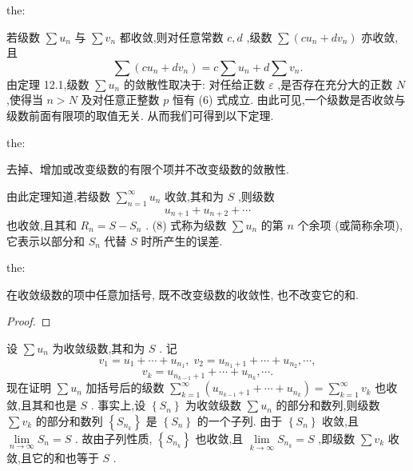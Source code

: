 \begin{theorem}{}{the:}

\end{theorem}
 若级数 \(\sum {u}_{n}\) 与 \(\sum {v}_{n}\) 都收敛,则对任意常数 \(c,d\) ,级数 \(\sum \left( {c{u}_{n} + d{v}_{n}}\right)\) 亦收敛, 且
\[
\sum \left( {c{u}_{n} + d{v}_{n}}\right)  = c\sum {u}_{n} + d\sum {v}_{n}.
\]
由定理 12.1,级数 \(\sum {u}_{n}\) 的敛散性取决于: 对任给正数 \(\varepsilon\) ,是否存在充分大的正数 \(N\) ,使得当 \(n > N\) 及对任意正整数 \(p\) 恒有 (6) 式成立. 由此可见,一个级数是否收敛与级数前面有限项的取值无关. 从而我们可得到以下定理.

\begin{theorem}{}{the:}

\end{theorem}
 去掉、增加或改变级数的有限个项并不改变级数的敛散性.

由此定理知道,若级数 \(\mathop{\sum }\limits_{{n = 1}}^{\infty }{u}_{n}\) 收敛,其和为 \(S\) ,则级数
\[
{u}_{n + 1} + {u}_{n + 2} + \cdots  \tag{8}
\]
也收敛,且其和 \({R}_{n} = S - {S}_{n}\) . (8) 式称为级数 \(\sum {u}_{n}\) 的第 \(n\) 个余项 (或简称余项),它表示以部分和 \({S}_{n}\) 代替 \(S\) 时所产生的误差.

\begin{theorem}{}{the:}

\end{theorem}
 在收敛级数的项中任意加括号, 既不改变级数的收敛性, 也不改变它的和.

\begin{proof}

\end{proof}
设 \(\sum {u}_{n}\) 为收敛级数,其和为 \(S\) . 记
\[
{v}_{1} = {u}_{1} + \cdots  + {u}_{{n}_{1}},\;{v}_{2} = {u}_{{n}_{1} + 1} + \cdots  + {u}_{{n}_{2}},\cdots ,
\]
\[
{v}_{k} = {u}_{{n}_{k - 1} + 1} + \cdots  + {u}_{{n}_{k}},\cdots .
\]
现在证明 \(\sum {u}_{n}\) 加括号后的级数 \(\mathop{\sum }\limits_{{k = 1}}^{\infty }\left( {{u}_{{n}_{k - 1} + 1} + \cdots  + {u}_{{n}_{k}}}\right)  = \mathop{\sum }\limits_{{k = 1}}^{\infty }{v}_{k}\) 也收敛,且其和也是 \(S\) . 事实上,设 \(\left\{  {S}_{n}\right\}\) 为收敛级数 \(\sum {u}_{n}\) 的部分和数列,则级数 \(\sum {v}_{k}\) 的部分和数列 \(\left\{  {S}_{{n}_{k}}\right\}\) 是 \(\left\{  {S}_{n}\right\}\) 的一个子列. 由于 \(\left\{  {S}_{n}\right\}\) 收敛,且 \(\mathop{\lim }\limits_{{n \rightarrow  \infty }}{S}_{n} = S\) . 故由子列性质, \(\left\{  {S}_{{n}_{k}}\right\}\) 也收敛,且 \(\mathop{\lim }\limits_{{k \rightarrow  \infty }}{S}_{{n}_{k}} = S\) ,即级数 \(\sum {v}_{k}\) 收敛,且它的和也等于 \(S\) .

